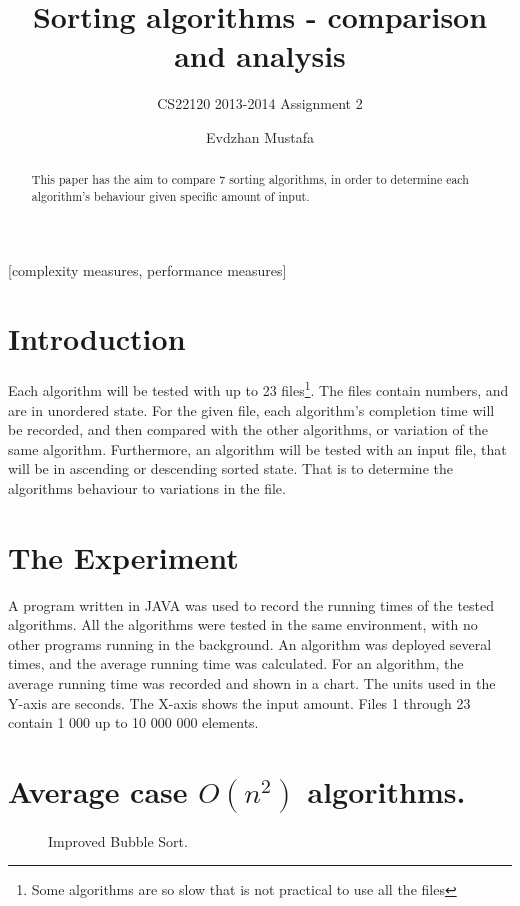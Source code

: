 \documentclass{acm_proc_article-sp}
\begin{document}
\title{Sorting algorithms - comparison and analysis }
\subtitle{ CS22120 2013-2014 Assignment 2 }
\author{
\alignauthor
Evdzhan Mustafa\\
}
\maketitle
\begin{abstract}
This paper has the aim to compare 7 sorting algorithms, in order to determine each algorithm's behaviour given specific amount of input.
\end{abstract}
[complexity measures, performance measures]
\section{Introduction}
Each algorithm will be tested with up to 23 files\footnote{Some algorithms are so slow that is not practical to use all the files}. The files contain numbers, and are in unordered state. For the given file, each algorithm's completion time will be recorded, and then compared with the other algorithms, or variation of the same algorithm. Furthermore, an algorithm will be tested with an input file, that will be in ascending or descending sorted state. That is to determine the algorithms behaviour to variations in the file.
\section{The {\secit Experiment }}
A program written in JAVA was used to record the running times of the tested algorithms. All the algorithms were tested in the same environment, with no other programs running in the background. An algorithm was deployed several times, and the average running time was calculated. For an algorithm, the average running time was recorded and shown in a chart. The units used in the Y-axis are seconds. The X-axis shows the input amount. Files 1 through 23 contain 1 000 up to 10 000 000 elements.
\section{Average case $O(n^2)$ algorithms.}
\begin{figure}[!htb]
\centering
\caption{Improved Bubble Sort.}
\end{figure}
\end{document}
